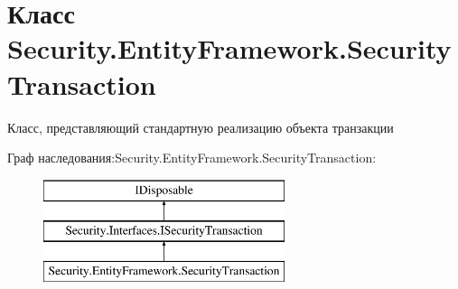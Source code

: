 \hypertarget{class_security_1_1_entity_framework_1_1_security_transaction}{}\section{Класс Security.\+Entity\+Framework.\+Security\+Transaction}
\label{class_security_1_1_entity_framework_1_1_security_transaction}


Класс, представляющий стандартную реализацию объекта транзакции  


Граф наследования\+:Security.\+Entity\+Framework.\+Security\+Transaction\+:\begin{figure}[H]
\begin{center}
\leavevmode
\includegraphics[height=3.000000cm]{df/d67/class_security_1_1_entity_framework_1_1_security_transaction}
\end{center}
\end{figure}

